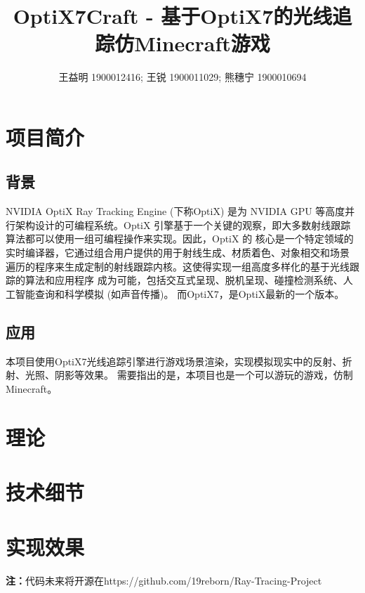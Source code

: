 \documentclass{article}
\title{OptiX7Craft - 基于OptiX7的光线追踪仿Minecraft游戏}
\author{王益明 1900012416; 王锐 1900011029; 熊穗宁 1900010694}
\begin{document}
    \maketitle
    \pagestyle{plain}

    \section{项目简介}
    \subsection{背景}
    NVIDIA OptiX Ray Tracking Engine (下称OptiX) 是为 NVIDIA GPU 等高度并行架构设计的可编程系统。OptiX
引擎基于一个关键的观察，即大多数射线跟踪算法都可以使用一组可编程操作来实现。因此，OptiX 的
核心是一个特定领域的实时编译器，它通过组合用户提供的用于射线生成、材质着色、对象相交和场景
遍历的程序来生成定制的射线跟踪内核。这使得实现一组高度多样化的基于光线跟踪的算法和应用程序
成为可能，包括交互式呈现、脱机呈现、碰撞检测系统、人工智能查询和科学模拟 (如声音传播)。
    而OptiX7，是OptiX最新的一个版本。
    
    \subsection{应用}
    本项目使用OptiX7光线追踪引擎进行游戏场景渲染，实现模拟现实中的反射、折射、光照、阴影等效果。
    需要指出的是，本项目也是一个可以游玩的游戏，仿制Minecraft。

    \section{理论}


    \section{技术细节}

    \section{实现效果}



    \textbf{注：}代码未来将开源在https://github.com/19reborn/Ray-Tracing-Project
\end{document}
